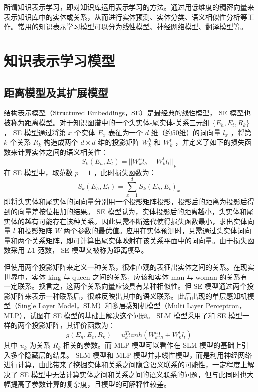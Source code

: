 \documentclass{llncs}
\begin{document}
所谓知识表示学习，即对知识库运用表示学习的方法。通过用低维度的稠密向量来表示知识库中的实体或关系，从而进行实体预测\cite{DBLP:journals/tkde/WangMWG17}、实体分类、语义相似性分析等工作。常用的知识表示学习模型可以分为线性模型、神经网络模型、翻译模型等。

\section{知识表示学习模型}

\subsection{距离模型及其扩展模型}

结构表示模型（Structured Embeddings，SE）\cite{DBLP:conf/aaai/BordesWCB11}是最经典的线性模型， SE 模型也被称为距离模型。对于知识图谱中的一个头实体-尾实体-关系三元组 $\{E_h, E_t, R_k\}$ ， SE 模型通过将第 $x$ 个实体 $E_x$ 表征为一个 $d$ 维（约50维）的词向量 $l_x$ ，将第 $k$ 个关系 $R_k$ 构造成两个 $d×d$ 维的投影矩阵 $W^h_k$ 和 $W^t_k$ ，并定义了如下的损失函数来计算实体之间的语义相关性：
\begin{displaymath}
S_k(E_h,E_t)=||W^h_kl_h-W^t_kl_t||_p
\end{displaymath}
在 SE 模型中，取范数 $p=1$ ，此时损失函数为：
\begin{displaymath}
S_k(E_h,E_t)=\sum_{x=1}^d{S_k(E_h,E_t)_x}
\end{displaymath}
即将头实体和尾实体的词向量分别用一个投影矩阵投影，投影后的距离为投影后得到的向量差按位相加的结果。 SE 模型认为，实体投影后的距离越小，头实体和尾实体的越有可能存在该种关系。因此只需不断迭代使得损失函数最小，求出实体向量 $l$ 和投影矩阵 $W$ 两个参数的最优值。应用在实体预测时，只需通过头实体词向量和两个关系矩阵，即可计算出尾实体映射在该关系平面中的词向量。由于损失函数采用 $L1$ 范数， SE 模型又被称为距离模型。

但使用两个投影矩阵来定义一种关系，很难直观的表征出实体之间的关系。在现实世界中，实体 king 与 queen 之间的关系，应该和实体 man 与 woman 的关系有一定联系。换言之，这两个关系向量应该具有某种相似性。但 SE 模型通过两个投影矩阵来表示一种联系后，很难反映出其中的语义联系。此后出现的单层感知机模型（Single Layer Model，SLM）\cite{DBLP:conf/nips/SocherCMN13}和多层感知机模型（Multi Layer Perceptron，MLP）\cite{DBLP:conf/kdd/0001GHHLMSSZ14}，试图在 SE 模型的基础上解决这个问题。 SLM 模型采用了和 SE 模型一样的两个投影矩阵，其评价函数为：
\begin{displaymath}
g(E_h,E_t,R_k)=u_k^Ttanh(W^h_kl_h+W^t_kl_t)
\end{displaymath}
其中 $u_k$ 为关系 $R_k$ 相关的参数。而 MLP 模型可以看作在 SLM 模型的基础上引入多个隐藏层的结果。 SLM 模型和 MLP 模型并非线性模型，而是利用神经网络进行计算，由此带来了挖掘实体和关系之间隐含语义联系的可能性，一定程度上解决了 SE 模型中无法计算实体之间和关系之间的语义联系的问题，但与此同时也大幅提高了参数计算的复杂度，且模型的可解释性较差。
\end{document}
